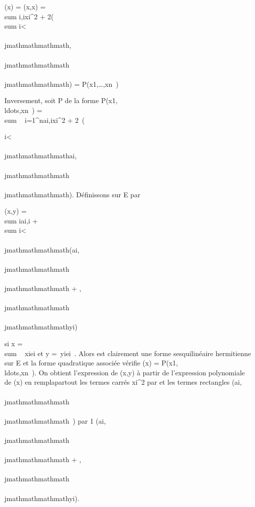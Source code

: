 \Phi(x) = \phi(x,x) = \\sum
i\omegai,i\textbar{}xi\textbar{}^2 +
2\mathrmRe(\\sum
i\textless{}\\\\jmathmathmathmath\omegai,\\\\jmathmathmathmath\overlinexix\\\\jmathmathmathmath)
=
P\Phi(x1,\ldots,xn~)

Inversement, soit P de la forme
P(x1,\\ldots,xn~)
= \\sum ~
i=1^nai,i\textbar{}xi\textbar{}^2
+
2\mathrmRe~(\\\sum

i\textless{}\\\\jmathmathmathmathai,\\\\jmathmathmathmath\overlinexix\\\\jmathmathmathmath).
Définissons \phi sur E par

\phi(x,y) = \\sum
iai,i\overlinexiyi
+ \\sum
i\textless{}\\\\jmathmathmathmath(ai,\\\\jmathmathmathmath\overlinexiy\\\\jmathmathmathmath
+
\overlineai,\\\\jmathmathmathmath\overlinex\\\\jmathmathmathmathyi)

si x = \\sum ~
xiei et y =\
\sum  yiei~. Alors \phi est
clairement une forme sesquilinéaire hermitienne sur E et la forme
quadratique associée vérifie \Phi(x) =
P(x1,\\ldots,xn~).
On obtient l'expression de \phi(x,y) à partir de l'expression polynomiale
de \Phi(x) en rempla\ccant partout les termes carrés
\textbar{}xi\textbar{}^2 par
\overlinexiyi et les termes
rectangles
\mathrmRe(ai,\\\\jmathmathmathmath\overlinexix\\\\jmathmathmathmath~)
par  1 \over 2
(ai,\\\\jmathmathmathmath\overlinexix\\\\jmathmathmathmath +
\overlineai,\\\\jmathmathmathmath\overlinex\\\\jmathmathmathmathyi).

